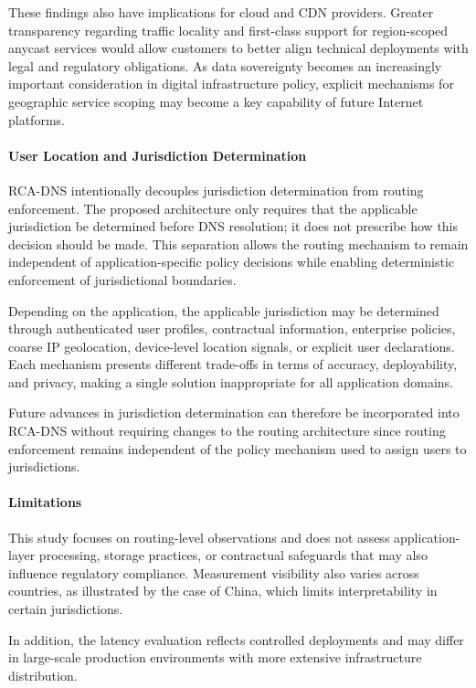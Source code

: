\documentclass[acmsmall]{acmart}
\begin{document}
These findings also have implications for cloud and CDN providers. Greater transparency regarding traffic locality and first-class support for region-scoped anycast services would allow customers to better align technical deployments with legal and regulatory obligations. As data sovereignty becomes an increasingly important consideration in digital infrastructure policy, explicit mechanisms for geographic service scoping may become a key capability of future Internet platforms.

\paragraph{User Location and Jurisdiction Determination}

RCA-DNS intentionally decouples jurisdiction determination from routing enforcement. The proposed architecture only requires that the applicable jurisdiction be determined before DNS resolution; it does not prescribe how this decision should be made. This separation allows the routing mechanism to remain independent of application-specific policy decisions while enabling deterministic enforcement of jurisdictional boundaries.

Depending on the application, the applicable jurisdiction may be determined through authenticated user profiles, contractual information, enterprise policies, coarse IP geolocation, device-level location signals, or explicit user declarations. Each mechanism presents different trade-offs in terms of accuracy, deployability, and privacy, making a single solution inappropriate for all application domains.

Future advances in jurisdiction determination can therefore be incorporated into RCA-DNS without requiring changes to the routing architecture since routing enforcement remains independent of the policy mechanism used to assign users to jurisdictions.

\paragraph{Limitations}

This study focuses on routing-level observations and does not assess application-layer processing, storage practices, or contractual safeguards that may also influence regulatory compliance. Measurement visibility also varies across countries, as illustrated by the case of China, which limits interpretability in certain jurisdictions.

In addition, the latency evaluation reflects controlled deployments and may differ in large-scale production environments with more extensive infrastructure distribution.
\end{document}

